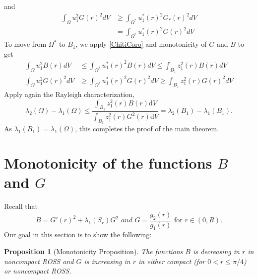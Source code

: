 \documentclass{amsart}
\numberwithin{equation}{section}
\theoremstyle{plain}
\newtheorem{prop}[theorem]{Proposition}
\theoremstyle{definition}
\theoremstyle{remark}
\begin{document}
            and\[\begin{aligned}
            \int_{\Omega} u_1^2G(r)^2 d V & \geq \int_{\Omega^*} u_1^*(r)^2 G_*(r)^2 d V \\
            & = \int_{\Omega^*} u_1^*(r)^2 G(r)^2 d V
            \end{aligned}\]
To move from $\Omega^*$ to $B_{1}$, we apply \cref{ChitiCoro} and monotonicity of $G$ and $B$ to get
\begin{align*}
                 \int_{\Omega} u_1^2 B(r) d V &\leq \int_{\Omega^*} u_1^*(r)^2 B(r) d V\leq \int_{B_{1}} z_1^2(r) B(r) d V \\
                 \int_{\Omega} u_1^2 G(r)^2 d V &\geq \int_{\Omega^*} u_1^*(r)^2 G(r)^2 d V \geq \int_{B_{1}} z_1^2(r) G(r)^2 d V
\end{align*}
Apply again the Rayleigh characterization,
\[\lambda_2(\Omega)-\lambda_1(\Omega) \leq \frac{\int_{B_1} z_1^2(r) B(r) \mathrm{d} V}{\int_{B_1} z_1^2(r) G^2(r) \mathrm{d} V}=\lambda_2\left(B_1\right)-\lambda_1\left(B_1\right) .\]
As $\lambda_1\left(B_1\right)= \lambda_1\left(\Omega\right)$, this completes the proof of the main theorem.









\section{Monotonicity of the functions $B$ and $G$}\label{Section: MonotonicityLemma}
Recall that \[B = G'(r)^2+\lambda_1(S_r)G^2 \textit{ and }G =\frac{g_2(r)}{g_1(r)}\text { for } r \in(0, R). \]
Our goal in this section is to show the following:
\begin{prop}[Monotonicity Proposition]\label{Monotonicity Lemma}
    The functions $B$ is decreasing in $r$ in noncompact ROSS and $G$ is increasing in $r$ in either compact (for $0<r\leq \pi/4$) or noncompact ROSS. 
\end{prop}
\end{document}

